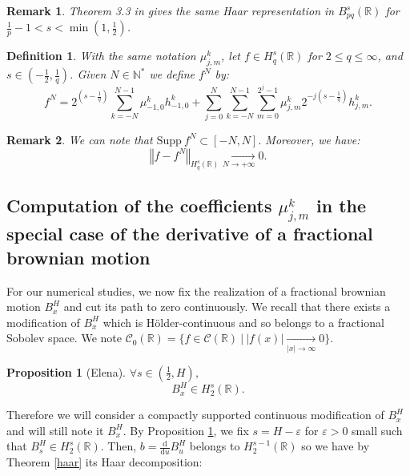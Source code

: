 \documentclass[11pt]{enstaPRE}
\newtheorem{defi}{Definition}
\newtheorem{Pro}[theo]{Proposition}
\newtheorem{rem}{Remark}
\newcommand{\de}[2]{\frac{\mathrm{d} #1}{\mathrm{d} #2}}
\newcommand{\norme}[1]{\left\Vert #1\right\Vert}
\newcommand{\R}{\mathbb{R}}
\newcommand{\N}{\mathbb{N}}
\begin{document}
\begin{rem}\label{besov}
    Theorem 3.3 in \cite{Tri-fab} gives the same Haar representation in $B^s_{pq}(\R)$ for $\frac{1}{p}-1<s<\min\left(1,\frac{1}{2}\right)$.
\end{rem}

\begin{defi}
    With the same notation $\mu_{j,m}^k $, let $f\in H^s_q(\R)$ for $2\leq q \leq \infty$, and $s\in\left(-\frac{1}{2},\frac{1}{q}\right)$. Given $N\in\N^*$ we define $f^N$ by:
    \begin{equation}
    f^N = 2^{\left(s-\frac{1}{q}\right)}\sum_{k=-N}^{N-1}\mu_{-1,0}^kh_{-1,0}^k+\sum_{j=0}^{N}\sum_{k=-N}^{N-1}\sum_{m=0}^{2^j-1}\mu_{j,m}^k2^{-j\left(s-\frac{1}{q}\right)}h_{j,m}^k.
    \end{equation}
\end{defi}

\begin{rem}
    We can note that $\mathrm{Supp}\ f^N\subset [-N,N].$ Moreover, we have: $$\norme{f-f^N}_{H_q^s(\R)} \underset{N\rightarrow+\infty}{\longrightarrow} 0.$$
\end{rem}

\subsection{Computation of the coefficients $\mu_{j,m}^k$ in the special case of the derivative of a fractional brownian motion}

For our numerical studies, we now fix the realization of a fractional brownian motion $B^H_x$ and cut its path to zero continuously. We recall that there exists a modification of $B^H_x$ which is Hölder-continuous and so belongs to a fractional Sobolev space. We note $\mathcal{C}_0(\R)=\{f\in\mathcal{C}(\R)\ |\ |f(x)| \underset{|x|\rightarrow \infty}{\longrightarrow} 0\}$. 

\begin{Pro}[Elena]\label{elena}
    $\forall s\in\left(\frac{1}{2},H\right),$
    \begin{equation}
    B^H_x\in H^s_2(\R).
    \end{equation}
\end{Pro}

Therefore we will consider a compactly supported continuous modification of $B^H_x$ and will still note it $B^H_x$. By Proposition \ref{elena}, we fix $s=H-\varepsilon$ for $\varepsilon>0$ small such that $B^H_s\in H^s_2(\R)$. Then, $b=\de{}{u} B^H_u$ belongs to $H^{s-1}_2(\R)$ so we have by Theorem \ref{haar} its Haar decomposition:
\end{document}

